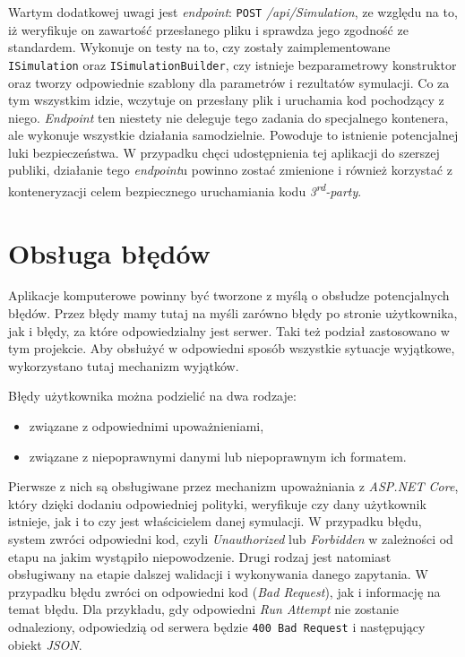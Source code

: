 \par Wartym dodatkowej uwagi jest \emph{endpoint}: \texttt{POST} \emph{/api/Simulation}, ze względu na to, iż weryfikuje on zawartość przesłanego pliku i sprawdza jego zgodność ze standardem. Wykonuje on testy na to, czy zostały zaimplementowane \texttt{ISimulation} oraz \texttt{ISimulationBuilder}, czy istnieje bezparametrowy konstruktor oraz tworzy odpowiednie szablony dla parametrów i rezultatów symulacji. Co za tym wszystkim idzie, wczytuje on przesłany plik i uruchamia kod pochodzący z niego. \emph{Endpoint} ten niestety nie deleguje tego zadania do specjalnego kontenera, ale wykonuje wszystkie działania samodzielnie. Powoduje to istnienie potencjalnej luki bezpieczeństwa. W przypadku chęci udostępnienia tej aplikacji do szerszej publiki, działanie tego \emph{endpoint}u powinno zostać zmienione i również korzystać z konteneryzacji celem bezpiecznego uruchamiania kodu \emph{3\textsuperscript{rd}-party}.

\section{Obsługa błędów}

\par Aplikacje komputerowe powinny być tworzone z myślą o obsłudze potencjalnych błędów. Przez błędy mamy tutaj na myśli zarówno błędy po stronie użytkownika, jak i błędy, za które odpowiedzialny jest serwer. Taki też podział zastosowano w tym projekcie. Aby obsłużyć w odpowiedni sposób wszystkie sytuacje wyjątkowe, wykorzystano tutaj mechanizm wyjątków.

\par Błędy użytkownika można podzielić na dwa rodzaje:
\begin{itemize}
	\item związane z odpowiednimi upoważnieniami,
	\item związane z niepoprawnymi danymi lub niepoprawnym ich formatem.
\end{itemize}
Pierwsze z nich są obsługiwane przez mechanizm upoważniania z \emph{ASP.NET Core}, który dzięki dodaniu odpowiedniej polityki, weryfikuje czy dany użytkownik istnieje, jak i to czy jest właścicielem danej symulacji. W przypadku błędu, system zwróci odpowiedni kod, czyli \emph{Unauthorized} lub \emph{Forbidden} w zależności od etapu na jakim wystąpiło niepowodzenie. Drugi rodzaj jest natomiast obsługiwany na etapie dalszej walidacji i wykonywania danego zapytania. W przypadku błędu zwróci on odpowiedni kod (\emph{Bad Request}), jak i informację na temat błędu. Dla przykładu, gdy odpowiedni \emph{Run Attempt} nie zostanie odnaleziony, odpowiedzią od serwera będzie \texttt{400 Bad Request} i następujący obiekt \emph{JSON}.

